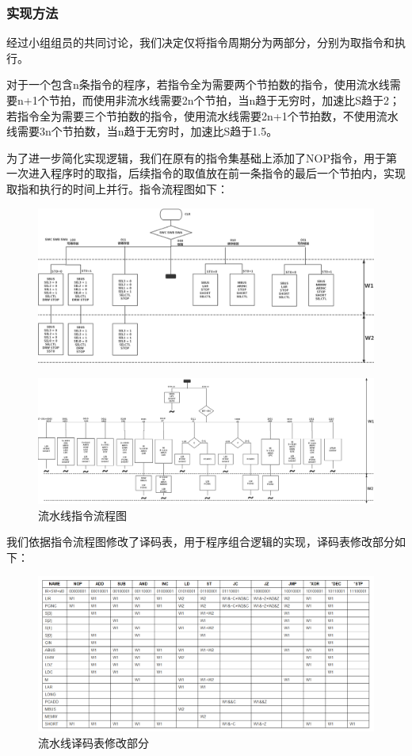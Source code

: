 \subsubsection{实现方法}
\par 
经过小组组员的共同讨论，我们决定仅将指令周期分为两部分，分别为取指令和执行。
\par
对于一个包含n条指令的程序，若指令全为需要两个节拍数的指令，使用流水线需要n+1个节拍，而使用非流水线需要2n个节拍，当n趋于无穷时，加速比S趋于2；若指令全为需要三个节拍数的指令，使用流水线需要2n+1个节拍数，不使用流水线需要3n个节拍数，当n趋于无穷时，加速比S趋于1.5。
\par 
为了进一步简化实现逻辑，我们在原有的指令集基础上添加了NOP指令，用于第一次进入程序时的取指，后续指令的取值放在前一条指令的最后一个节拍内，实现取指和执行的时间上并行。指令流程图如下：
\begin{figure}[hbt!]
    \centering
    \label{流水线指令流程图1}
    \includegraphics[width=\textwidth]{figures/chapter3/流水线指令流程图1.png}
\end{figure}
\newpage
\begin{figure}[hbt!]
    \centering
    \label{流水线指令流程图2}
    \includegraphics[width=\textwidth]{figures/chapter3/流水线指令流程图2.png}
    \caption{流水线指令流程图}
\end{figure}
\par
我们依据指令流程图修改了译码表，用于程序组合逻辑的实现，译码表修改部分如下：
\begin{figure}[hbt!]
    \centering
    \label{流水线译码表修改部分}
    \includegraphics[width=\textwidth]{figures/chapter3/流水线译码表修改部分.png}
    \caption{流水线译码表修改部分}
\end{figure}


